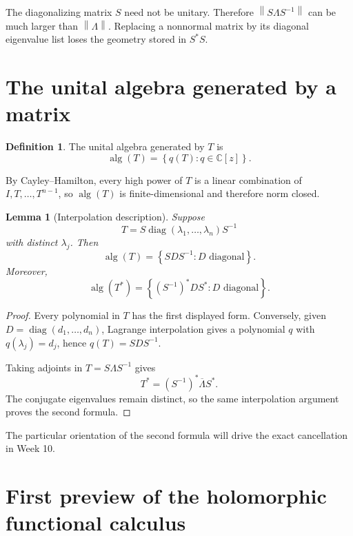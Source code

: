 \documentclass[11pt,oneside,openany]{book}
\newtheorem{lemma}[theorem]{Lemma}
\theoremstyle{definition}
\newtheorem{definition}[theorem]{Definition}
\theoremstyle{remark}
\newcommand{\C}{\mathbb C}
\newcommand{\alg}{\operatorname{alg}}
\newcommand{\diag}{\operatorname{diag}}
\newcommand{\norm}[1]{\left\lVert #1\right\rVert}
\newcommand{\set}[1]{\left\{#1\right\}}
\begin{document}
\begin{pitfall}
The diagonalizing matrix \(S\) need not be unitary.  Therefore
\(\norm{S\Lambda S^{-1}}\) can be much larger than \(\norm{\Lambda}\).
Replacing a nonnormal matrix by its diagonal eigenvalue list loses the
geometry stored in \(S^*S\).
\end{pitfall}

\section{The unital algebra generated by a matrix}

\begin{definition}
The unital algebra generated by \(T\) is
\[
  \alg(T)=\set{q(T):q\in\C[z]}.
\]
\end{definition}

By Cayley--Hamilton, every high power of \(T\) is a linear combination
of \(I,T,\ldots,T^{n-1}\), so \(\alg(T)\) is finite-dimensional and
therefore norm closed.

\begin{lemma}[Interpolation description]
\label{lem:alg-simple}
Suppose
\[
  T=S\diag(\lambda_1,\ldots,\lambda_n)S^{-1}
\]
with distinct \(\lambda_j\).  Then
\[
  \alg(T)
  =\set{SDS^{-1}:D\text{ diagonal}}.
\]
Moreover,
\[
  \alg(T^*)
  =\set{(S^{-1})^*DS^*:D\text{ diagonal}}.
\]
\end{lemma}

\begin{proof}
Every polynomial in \(T\) has the first displayed form.  Conversely,
given \(D=\diag(d_1,\ldots,d_n)\), Lagrange interpolation gives a
polynomial \(q\) with \(q(\lambda_j)=d_j\), hence
\(q(T)=SDS^{-1}\).

Taking adjoints in \(T=S\Lambda S^{-1}\) gives
\[
  T^*=(S^{-1})^*\overline{\Lambda}S^*.
\]
The conjugate eigenvalues remain distinct, so the same interpolation
argument proves the second formula.
\end{proof}

The particular orientation of the second formula will drive the exact
cancellation in Week 10.

\section{First preview of the holomorphic functional calculus}
\end{document}
